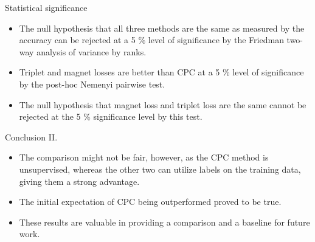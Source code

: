\documentclass[10pt]{beamer}
\begin{document}
\begin{frame}{Statistical significance}
	\begin{itemize}
		\item The null hypothesis that all three methods are the same as measured by the accuracy can be rejected at a 5 \% level of significance by the Friedman two-way analysis of variance by ranks.
		\item Triplet and magnet losses are better than CPC at a 5 \% level of significance by the post-hoc Nemenyi pairwise test.
		\item The null hypothesis that magnet loss and triplet loss are the same cannot be rejected at the 5 \% significance level by this test.
	\end{itemize}
\end{frame}

\begin{frame}{Conclusion II.}
	\begin{itemize}
		\item The comparison might not be fair, however, as the CPC method is unsupervised, whereas the other two can utilize labels on the training data, giving them a strong advantage.
		\item The initial expectation of CPC being outperformed proved to be true.
		\item These results are valuable in providing a comparison and a baseline for future work.
	\end{itemize}
\end{frame}
\end{document}
